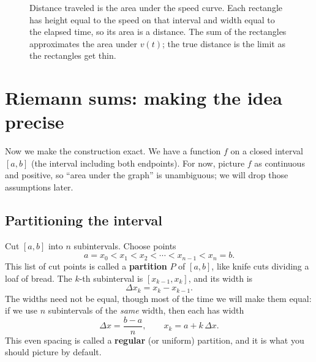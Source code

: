 \begin{figure}[htbp]
\centering
{}
\caption{Distance traveled is the area under the speed curve. Each rectangle has
height equal to the speed on that interval and width equal to the elapsed time,
so its area is a distance. The sum of the rectangles approximates the area under
$v(t)$; the true distance is the limit as the rectangles get thin.}
\label{ch20:fig-speed}
\end{figure}

\section{Riemann sums: making the idea precise}
\label{ch20:riemann}

Now we make the construction exact. We have a function $f$ on a
closed interval $[a,b]$ (the interval including both endpoints). For now,
picture $f$ as continuous and positive, so ``area under the graph'' is
unambiguous; we will drop those assumptions later.

\subsection{Partitioning the interval}

Cut $[a,b]$ into $n$ subintervals. Choose points
\[
  a = x_0 < x_1 < x_2 < \cdots < x_{n-1} < x_n = b.
\]
This list of cut points is called a \textbf{partition} $P$ of $[a,b]$, like
knife cuts dividing a loaf of bread. The $k$-th subinterval
is $[x_{k-1}, x_k]$, and its width is
\[
  \Delta x_k = x_k - x_{k-1}.
\]
The widths need not be equal, though most of the time we will make them equal:
if we use $n$ subintervals of the \emph{same} width, then each has width
\[
  \Delta x = \frac{b-a}{n}, \qquad x_k = a + k\,\Delta x.
\]
This even spacing is called a \textbf{regular} (or uniform) partition, and it is
what you should picture by default.


